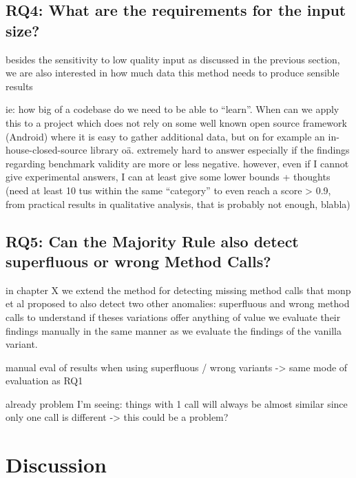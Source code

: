 \subsection{RQ4: What are the requirements for the input size?}

besides the sensitivity to low quality input as discussed in the previous section, we are also interested in how much data this method needs to produce sensible results

ie: how big of a codebase do we need to be able to ``learn''. When can we apply this to a project which does not rely on some well known open source framework (Android) where it is easy to gather additional data, but on for example an in-house-closed-source library oä.
extremely hard to answer especially if the findings regarding benchmark validity are more or less negative.
however, even if I cannot give experimental answers, I can at least give some lower bounds + thoughts
(need at least 10 tus within the same ``category'' to even reach a score > 0.9, from practical results in qualitative analysis, that is probably not enough, blabla)


\subsection{RQ5: Can the Majority Rule also detect superfluous or wrong Method Calls?}

in chapter X we extend the method for detecting missing method calls that monp et al proposed to also detect two other anomalies:
superfluous and wrong method calls
to understand if theses variations offer anything of value we evaluate their findings manually in the same manner as we evaluate the findings of the vanilla variant.

manual eval of results when using superfluous / wrong variants
-> same mode of evaluation as RQ1

already problem I'm seeing: things with 1 call will always be almost similar since only one call is different
 -> this could be a problem?

\section{Discussion}

